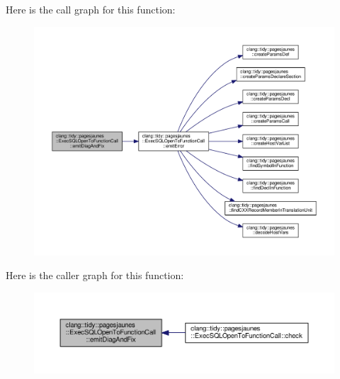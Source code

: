 Here is the call graph for this function\+:
\nopagebreak
\begin{figure}[H]
\begin{center}
\leavevmode
\includegraphics[width=350pt]{classclang_1_1tidy_1_1pagesjaunes_1_1_exec_s_q_l_open_to_function_call_a00b269de2e10d828f3f588911dfc749c_cgraph}
\end{center}
\end{figure}
Here is the caller graph for this function\+:
\nopagebreak
\begin{figure}[H]
\begin{center}
\leavevmode
\includegraphics[width=350pt]{classclang_1_1tidy_1_1pagesjaunes_1_1_exec_s_q_l_open_to_function_call_a00b269de2e10d828f3f588911dfc749c_icgraph}
\end{center}
\end{figure}
\mbox{\label{classclang_1_1tidy_1_1pagesjaunes_1_1_exec_s_q_l_open_to_function_call_a8bf527ab87666c879c7fcb9410a52878}} 
